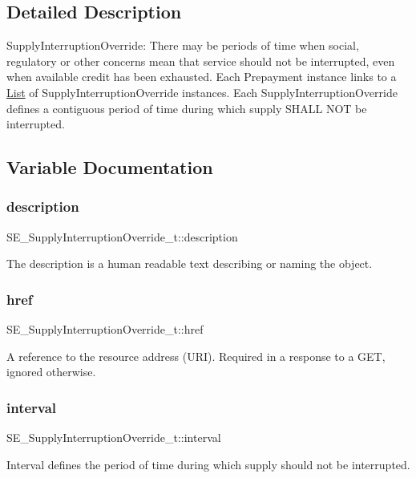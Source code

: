 \subsection{Detailed Description}
Supply\+Interruption\+Override\+: There may be periods of time when social, regulatory or other concerns mean that service should not be interrupted, even when available credit has been exhausted. Each Prepayment instance links to a \hyperlink{structList}{List} of Supply\+Interruption\+Override instances. Each Supply\+Interruption\+Override defines a contiguous period of time during which supply S\+H\+A\+LL N\+OT be interrupted. 

\subsection{Variable Documentation}
\mbox{\label{group__SupplyInterruptionOverride_ga767528d74873c66ccdc1a25173c7fab1}} 
\subsubsection{\texorpdfstring{description}{description}}
{\footnotesize\ttfamily S\+E\+\_\+\+Supply\+Interruption\+Override\+\_\+t\+::description}

The description is a human readable text describing or naming the object. \mbox{\label{group__SupplyInterruptionOverride_ga70c5ab94b2f05661715eb2a3db266774}} 
\subsubsection{\texorpdfstring{href}{href}}
{\footnotesize\ttfamily S\+E\+\_\+\+Supply\+Interruption\+Override\+\_\+t\+::href}

A reference to the resource address (U\+RI). Required in a response to a G\+ET, ignored otherwise. \mbox{\label{group__SupplyInterruptionOverride_ga2b48753110e59127cbe7b7a2886512ea}} 
\subsubsection{\texorpdfstring{interval}{interval}}
{\footnotesize\ttfamily S\+E\+\_\+\+Supply\+Interruption\+Override\+\_\+t\+::interval}

Interval defines the period of time during which supply should not be interrupted. 